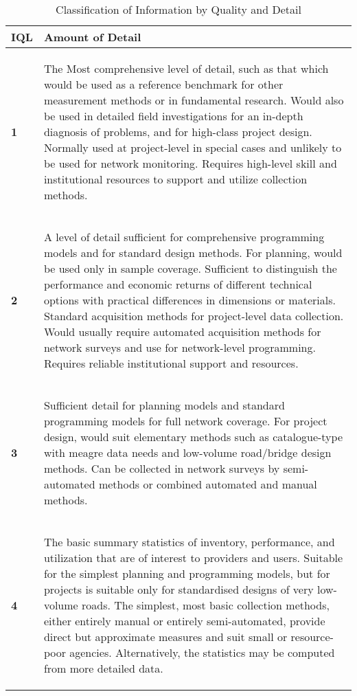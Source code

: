 \documentclass[tesi]{subfiles}
\begin{document}
\begin{table}[ht]\label{tb:iql_detail}
\centering
    \begin{tabular}{ | l | p{15cm} |}

    \hline
    \textbf{IQL} & \hspace{5cm}
   \textbf{ Amount of Detail} \\ \hline


    \textbf{1} & \begin{footnotesize}
    The Most comprehensive level of detail, such as that which would be used as a
reference benchmark for other measurement methods or in fundamental
research. Would also be used in detailed field investigations for an in-depth
diagnosis of problems, and for high-class project design. Normally used at
project-level in special cases and unlikely to be used for network monitoring.
Requires high-level skill and institutional resources to support and utilize
collection methods.
    \end{footnotesize}\\
	\textbf{2} & \begin{footnotesize}
	A level of detail sufficient for comprehensive programming models and for
standard design methods. For planning, would be used only in sample coverage.
Sufficient to distinguish the performance and economic returns of different
technical options with practical differences in dimensions or materials. Standard
acquisition methods for project-level data collection. Would usually require
automated acquisition methods for network surveys and use for network-level
programming. Requires reliable institutional support and resources.
	\end{footnotesize} \\
	\textbf{3} &\begin{footnotesize}
	 Sufficient detail for planning models and standard programming models for full
network coverage. For project design, would suit elementary methods such as
catalogue-type with meagre data needs and low-volume road/bridge design
methods. Can be collected in network surveys by semi-automated methods or
combined automated and manual methods.
	\end{footnotesize}\\
	\textbf{4} & \begin{footnotesize}
	The basic summary statistics of inventory, performance, and utilization that are
of interest to providers and users. Suitable for the simplest planning and
programming models, but for projects is suitable only for standardised designs of
very low-volume roads. The simplest, most basic collection methods, either
entirely manual or entirely semi-automated, provide direct but approximate
measures and suit small or resource-poor agencies. Alternatively, the statistics
may be computed from more detailed data.
	\end{footnotesize} \\


\hline
    \end{tabular}
 \caption{Classification of Information by Quality and Detail}
\end{table}
\clearpage
\end{document}
